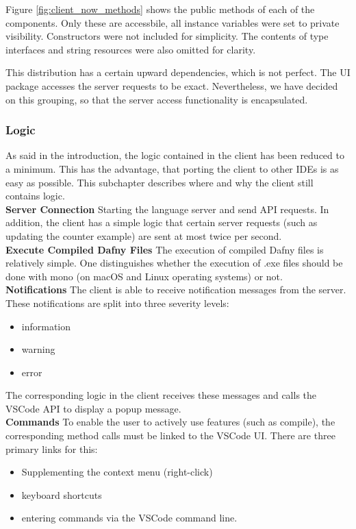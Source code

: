 Figure \ref{fig:client_now_methods} shows the public methods of each of the components. Only these are accessbile, all instance variables were set to private visibility. Constructors were not included for simplicity. The contents of type interfaces and string resources were also omitted for clarity.


This distribution has a certain upward dependencies, which is not perfect.
The UI package accesses the server requests to be exact.
Nevertheless, we have decided on this grouping,
so that the server access functionality is encapsulated.

\subsubsection{Logic}
As said in the introduction, the logic contained in the client has been reduced to a minimum.
This has the advantage, that porting the client to other IDEs is as easy as possible.
This subchapter describes where and why the client still contains logic.\\

{\bf Server Connection} \textendash{}
Starting the language server and send API requests. In addition, the client has a simple logic that
certain server requests (such as updating the counter example) are sent at most twice per second. \\

{\bf Execute Compiled Dafny Files} \textendash{}
The execution of compiled Dafny files is relatively simple. One distinguishes whether the execution
of .exe files should be done with mono (on macOS and Linux operating systems) or not. \\

{\bf Notifications} \textendash{}
The client is able to receive notification messages from the server.
These notifications are split into three severity levels:
\begin{itemize}
    \item information
    \item warning
    \item error
\end{itemize}
The corresponding logic in the client receives these messages and calls the VSCode API to display a popup message. \\

{\bf Commands} \textendash{}
To enable the user to actively use features (such as compile),
the corresponding method calls must be linked to the VSCode UI.
There are three primary links for this:
\begin{itemize}
    \item Supplementing the context menu (right-click)
    \item keyboard shortcuts
    \item entering commands via the VSCode command line.
\end{itemize}

